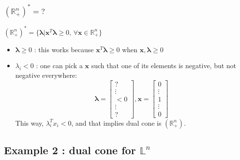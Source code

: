 \documentclass[11pt,a4paper]{article}
\begin{document}
\subsubsection*{$(\mathbb{R}_{+}^n)^*=?$}
$(\mathbb{R}^n_+)^*=\{\boldsymbol{\lambda} | \boldsymbol{x}^T \boldsymbol{\lambda} \geq 0\textrm{, } \forall \boldsymbol{x} \in \mathbb{R}^n_+ \}$
\begin{itemize}
\item $\boldsymbol{\lambda} \geq 0$ : this works because $\boldsymbol{x}^T \boldsymbol{\lambda} \geq 0$ when $\boldsymbol{x},\boldsymbol{\lambda} \geq 0$
\item $\lambda_i < 0$ : one can pick a $\boldsymbol{x}$ such that one of its elements is negative, but not negative everywhere: 
\[\boldsymbol{\lambda}=\begin{bmatrix}
 ?\\
 \vdots\\
 <0\\
 \vdots\\
 ?
\end{bmatrix},\boldsymbol{x}=\begin{bmatrix}
 0\\
 \vdots\\
 1\\
 \vdots\\
 0
\end{bmatrix}\]
This way, $\lambda_i^T x_i < 0$, and that implies dual cone is $(\mathbb{R}_{+}^n)$.
\end{itemize}
\subsection*{Example 2 : dual cone for $\mathbb{L}^n$}
\end{document}
